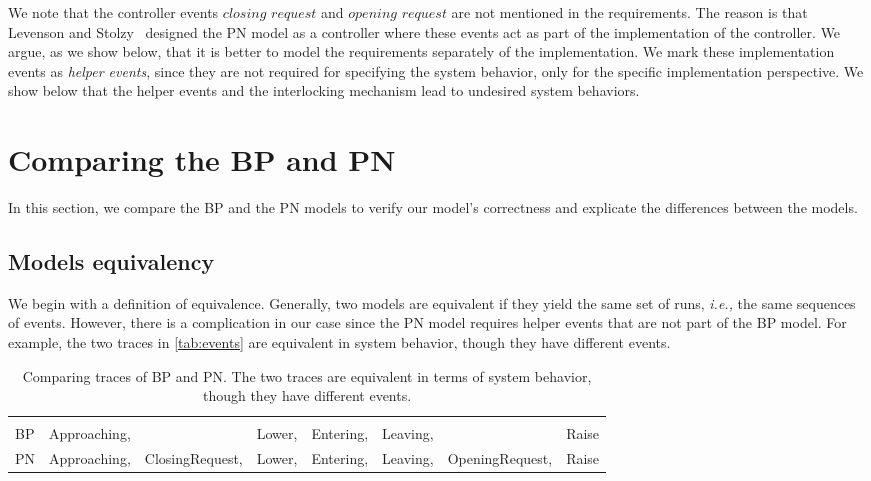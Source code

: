 \documentclass[10pt,journal,compsoc]{IEEEtran}
\theoremstyle{definition}
\newcommand{\ie}{\emph{i.e.,}\xspace}
\begin{document}
We note that the controller events $\mathit{closing}$ $\mathit{request}$ and $\mathit{opening}$ $\mathit{request}$ are not mentioned in the requirements. 
The reason is that Levenson and Stolzy~\cite{leveson1987safety} designed the PN model as a controller where these events act as part of the implementation of the controller. 
We argue, as we show below, that it is better to model the requirements separately of the implementation. 
We mark these implementation events as \emph{helper events}, since they are not required for specifying the system behavior, only for the specific implementation perspective. We show below that the helper events and the interlocking mechanism lead to undesired system behaviors.


\section{Comparing the BP and PN}
\label{sec:comparing-bp-and-pn}
In this section, we compare the BP and the PN models to verify our model's correctness and explicate the differences between the models.

\subsection{Models equivalency}
\label{sec:comparing-bp-and-pn:equivalency}
We begin with a definition of equivalence. Generally, two models are equivalent if they yield the same set of runs, \ie the same sequences of events. However, there is a complication in our case since the PN model requires helper events that are not part of the BP model. For example, the two traces in \autoref{tab:events} are equivalent in system behavior, though they have different events.

\begin{table*}
\caption{Comparing traces of BP and PN. The two traces are equivalent in terms of system behavior, though they have different events.}
\label{tab:events}
\centering
\begin{tabular}{l|lllllll}
\hline \\
BP & Approaching, & & Lower, & Entering, & Leaving, & & Raise  \\ [1ex]
PN & Approaching, & ClosingRequest, & Lower, & Entering, & Leaving, & OpeningRequest, & Raise \\ [1ex]
\hline
\end{tabular}
\end{table*}
\end{document}
